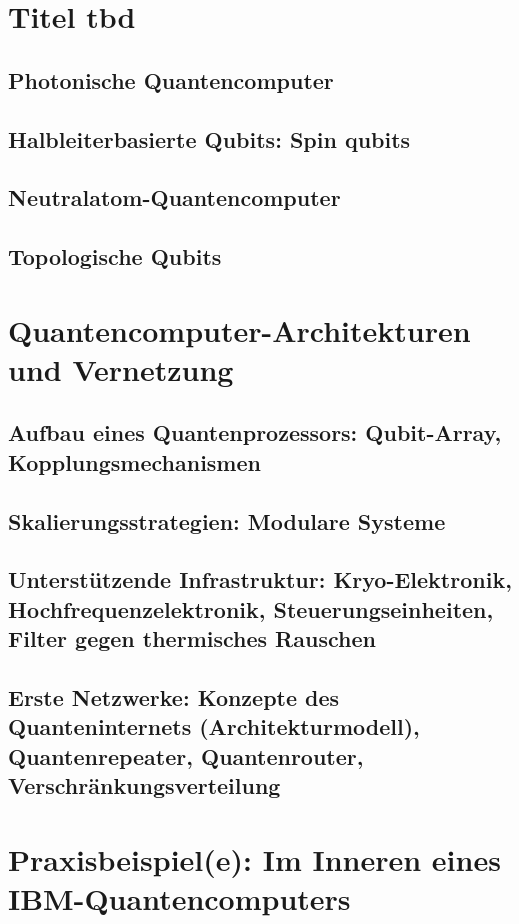 \section{Titel tbd}
\subsection{Photonische Quantencomputer}
\subsection{Halbleiterbasierte Qubits: Spin qubits}
\subsection{Neutralatom-Quantencomputer}
\subsection{Topologische Qubits}


\section{Quantencomputer-Architekturen und Vernetzung}
\subsection{Aufbau eines Quantenprozessors: Qubit-Array, Kopplungsmechanismen}
\subsection{Skalierungsstrategien: Modulare Systeme}
\subsection{Unterstützende Infrastruktur: Kryo-Elektronik, Hochfrequenzelektronik, Steuerungseinheiten, Filter gegen thermisches Rauschen}
\subsection{Erste Netzwerke: Konzepte des Quanteninternets (Architekturmodell), Quantenrepeater, Quantenrouter, Verschränkungsverteilung}

\section{Praxisbeispiel(e): Im Inneren eines IBM-Quantencomputers}

